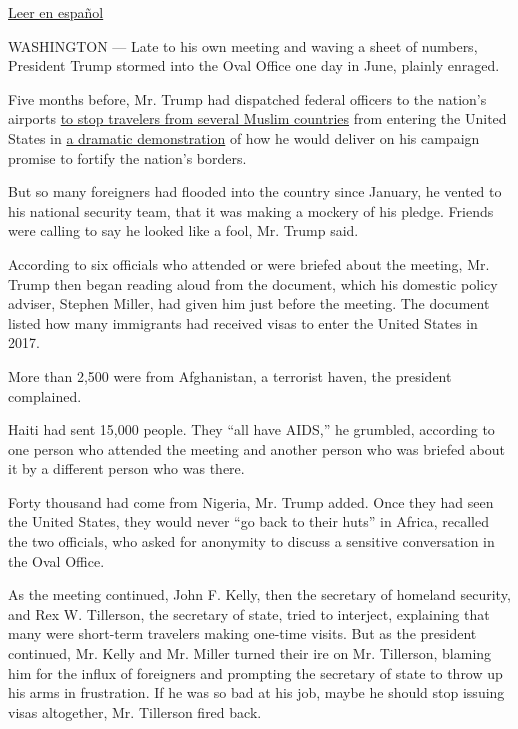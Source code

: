 \href{https://www.nytimes3xbfgragh.onion/es/2017/12/27/como-trump-transformo-las-politicas-migratorias-de-estados-unidos}{Leer
en español}

WASHINGTON --- Late to his own meeting and waving a sheet of numbers,
President Trump stormed into the Oval Office one day in June, plainly
enraged.

Five months before, Mr. Trump had dispatched federal officers to the
nation's airports
\href{https://www.nytimes3xbfgragh.onion/2017/01/27/us/politics/trump-syrian-refugees.html}{to
stop travelers from several Muslim countries} from entering the United
States in
\href{https://www.nytimes3xbfgragh.onion/2017/01/28/us/refugees-detained-at-us-airports-prompting-legal-challenges-to-trumps-immigration-order.html}{a
dramatic demonstration} of how he would deliver on his campaign promise
to fortify the nation's borders.

But so many foreigners had flooded into the country since January, he
vented to his national security team, that it was making a mockery of
his pledge. Friends were calling to say he looked like a fool, Mr. Trump
said.

According to six officials who attended or were briefed about the
meeting, Mr. Trump then began reading aloud from the document, which his
domestic policy adviser, Stephen Miller, had given him just before the
meeting. The document listed how many immigrants had received visas to
enter the United States in 2017.

More than 2,500 were from Afghanistan, a terrorist haven, the president
complained.

Haiti had sent 15,000 people. They ``all have AIDS,'' he grumbled,
according to one person who attended the meeting and another person who
was briefed about it by a different person who was there.

Forty thousand had come from Nigeria, Mr. Trump added. Once they had
seen the United States, they would never ``go back to their huts'' in
Africa, recalled the two officials, who asked for anonymity to discuss a
sensitive conversation in the Oval Office.

As the meeting continued, John F. Kelly, then the secretary of homeland
security, and Rex W. Tillerson, the secretary of state, tried to
interject, explaining that many were short-term travelers making
one-time visits. But as the president continued, Mr. Kelly and Mr.
Miller turned their ire on Mr. Tillerson, blaming him for the influx of
foreigners and prompting the secretary of state to throw up his arms in
frustration. If he was so bad at his job, maybe he should stop issuing
visas altogether, Mr. Tillerson fired back.

